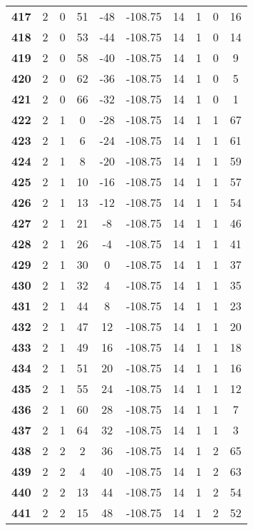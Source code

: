 \documentclass[12pt,letterpaper, onecolumn]{exam}
\begin{document}
\begin{longtable}{cccccccccc}
    \textbf{417} & 2 & 0 & 51 & -48 & -108.75 & 14 & 1 & 0 & 16 \\ 
    \textbf{418} & 2 & 0 & 53 & -44 & -108.75 & 14 & 1 & 0 & 14 \\ 
    \textbf{419} & 2 & 0 & 58 & -40 & -108.75 & 14 & 1 & 0 & 9 \\ 
    \textbf{420} & 2 & 0 & 62 & -36 & -108.75 & 14 & 1 & 0 & 5 \\ 
    \textbf{421} & 2 & 0 & 66 & -32 & -108.75 & 14 & 1 & 0 & 1 \\ 
    \textbf{422} & 2 & 1 & 0 & -28 & -108.75 & 14 & 1 & 1 & 67 \\ 
    \textbf{423} & 2 & 1 & 6 & -24 & -108.75 & 14 & 1 & 1 & 61 \\ 
    \textbf{424} & 2 & 1 & 8 & -20 & -108.75 & 14 & 1 & 1 & 59 \\ 
    \textbf{425} & 2 & 1 & 10 & -16 & -108.75 & 14 & 1 & 1 & 57 \\ 
    \textbf{426} & 2 & 1 & 13 & -12 & -108.75 & 14 & 1 & 1 & 54 \\ 
    \textbf{427} & 2 & 1 & 21 & -8 & -108.75 & 14 & 1 & 1 & 46 \\ 
    \textbf{428} & 2 & 1 & 26 & -4 & -108.75 & 14 & 1 & 1 & 41 \\ 
    \textbf{429} & 2 & 1 & 30 & 0 & -108.75 & 14 & 1 & 1 & 37 \\ 
    \textbf{430} & 2 & 1 & 32 & 4 & -108.75 & 14 & 1 & 1 & 35 \\ 
    \textbf{431} & 2 & 1 & 44 & 8 & -108.75 & 14 & 1 & 1 & 23 \\ 
    \textbf{432} & 2 & 1 & 47 & 12 & -108.75 & 14 & 1 & 1 & 20 \\ 
    \textbf{433} & 2 & 1 & 49 & 16 & -108.75 & 14 & 1 & 1 & 18 \\ 
    \textbf{434} & 2 & 1 & 51 & 20 & -108.75 & 14 & 1 & 1 & 16 \\ 
    \textbf{435} & 2 & 1 & 55 & 24 & -108.75 & 14 & 1 & 1 & 12 \\ 
    \textbf{436} & 2 & 1 & 60 & 28 & -108.75 & 14 & 1 & 1 & 7 \\ 
    \textbf{437} & 2 & 1 & 64 & 32 & -108.75 & 14 & 1 & 1 & 3 \\ 
    \textbf{438} & 2 & 2 & 2 & 36 & -108.75 & 14 & 1 & 2 & 65 \\ 
    \textbf{439} & 2 & 2 & 4 & 40 & -108.75 & 14 & 1 & 2 & 63 \\ 
    \textbf{440} & 2 & 2 & 13 & 44 & -108.75 & 14 & 1 & 2 & 54 \\ 
    \textbf{441} & 2 & 2 & 15 & 48 & -108.75 & 14 & 1 & 2 & 52 \\ 

\end{longtable}
\end{document}
